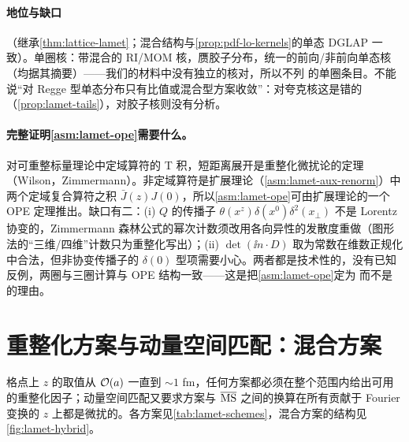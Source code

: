 \paragraph{地位与缺口}
\tagA（继承\cref{thm:lattice-lamet}；混合结构与\cref{prop:pdf-lo-kernels}的单态 DGLAP 一致）。单圈核：带混合的 RI/MOM 核\cite{Wang:2019tgg}，赝胶子分布\cite{Balitsky:2019krf}，统一的前向/非前向单态核\cite{Yao:2022vtp}（均据其摘要）——我们的材料中没有独立的核对，所以不列 \tagR 的单圈条目。不能说“对 Regge 型单态分布只有比值或混合型方案收敛”：对夸克核这是错的（\cref{prop:lamet-tails}），对胶子核则没有分析。

\paragraph{完整证明\cref{asm:lamet-ope}需要什么。}
对可重整标量理论中定域算符的 T 积，短距离展开是重整化微扰论的定理（Wilson\cite{Wilson1969}，Zimmermann\cite{Zimmermann1973}）。非定域算符是扩展理论（\cref{asm:lamet-aux-renorm}）中两个定域复合算符之积 $\bar J(z)J(0)$，所以\cref{asm:lamet-ope}可由扩展理论的一个 OPE 定理推出。缺口有二：(i) $Q$ 的传播子 $\theta(x^z)\delta(x^0)\delta^2(x_\perp)$ 不是 Lorentz 协变的，Zimmermann 森林公式的幂次计数须改用各向异性的发散度重做（图形法的“三维/四维”计数只为重整化写出）；(ii) $\det(\ii n\cdot D)$ 取为常数在维数正规化中合法，但非协变传播子的 $\delta(0)$ 型项需要小心。两者都是技术性的，没有已知反例，两圈与三圈计算与 OPE 结构一致——这是把\cref{asm:lamet-ope}定为 \tagA 而不是 \tagC 的理由。

\section{重整化方案与动量空间匹配：混合方案}\label{sec:lamet-schemes}

格点上 $z$ 的取值从 $\mathcal{O}\!\left(a\right)$ 一直到 $\sim1$ fm，任何方案都必须在整个范围内给出可用的重整化因子；动量空间匹配又要求方案与 $\overline{\mathrm{MS}}$ 之间的换算在所有贡献于 Fourier 变换的 $z$ 上都是微扰的。各方案见\cref{tab:lamet-schemes}，混合方案的结构见\cref{fig:lamet-hybrid}。

